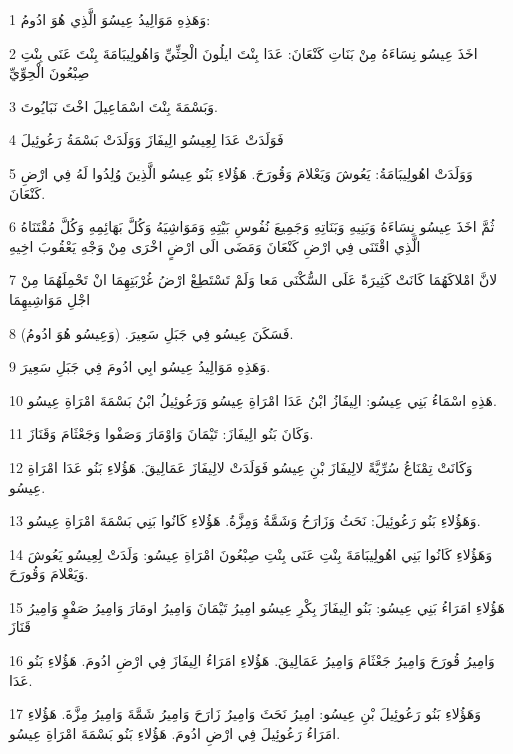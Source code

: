 \par 1 وَهَذِهِ مَوَالِيدُ عِيسُوَ الَّذِي هُوَ ادُومُ:
\par 2 اخَذَ عِيسُو نِسَاءَهُ مِنْ بَنَاتِ كَنْعَانَ: عَدَا بِنْتَ ايلُونَ الْحِثِّيِّ وَاهُولِيبَامَةَ بِنْتَ عَنَى بِنْتِ صِبْعُونَ الْحِوِّيِّ
\par 3 وَبَسْمَةَ بِنْتَ اسْمَاعِيلَ اخْتَ نَبَايُوتَ.
\par 4 فَوَلَدَتْ عَدَا لِعِيسُو الِيفَازَ وَوَلَدَتْ بَسْمَةُ رَعُوئِيلَ
\par 5 وَوَلَدَتْ اهُولِيبَامَةُ: يَعُوشَ وَيَعْلامَ وَقُورَحَ. هَؤُلاءِ بَنُو عِيسُو الَّذِينَ وُلِدُوا لَهُ فِي ارْضِ كَنْعَانَ.
\par 6 ثُمَّ اخَذَ عِيسُو نِسَاءَهُ وَبَنِيهِ وَبَنَاتِهِ وَجَمِيعَ نُفُوسِ بَيْتِهِ وَمَوَاشِيَهُ وَكُلَّ بَهَائِمِهِ وَكُلَّ مُقْتَنَاهُ الَّذِي اقْتَنَى فِي ارْضِ كَنْعَانَ وَمَضَى الَى ارْضٍ اخْرَى مِنْ وَجْهِ يَعْقُوبَ اخِيهِ
\par 7 لانَّ امْلاكَهُمَا كَانَتْ كَثِيرَةً عَلَى السُّكْنَى مَعا وَلَمْ تَسْتَطِعْ ارْضُ غُرْبَتِهِمَا انْ تَحْمِلَهُمَا مِنْ اجْلِ مَوَاشِيهِمَا
\par 8 فَسَكَنَ عِيسُو فِي جَبَلِ سَعِيرَ. (وَعِيسُو هُوَ ادُومُ).
\par 9 وَهَذِهِ مَوَالِيدُ عِيسُو ابِي ادُومَ فِي جَبَلِ سَعِيرَ.
\par 10 هَذِهِ اسْمَاءُ بَنِي عِيسُو: الِيفَازُ ابْنُ عَدَا امْرَاةِ عِيسُو وَرَعُوئِيلُ ابْنُ بَسْمَةَ امْرَاةِ عِيسُو.
\par 11 وَكَانَ بَنُو الِيفَازَ: تَيْمَانَ وَاوْمَارَ وَصَفْوا وَجَعْثَامَ وَقَنَازَ.
\par 12 وَكَانَتْ تِمْنَاعُ سُرِّيَّةً لالِيفَازَ بْنِ عِيسُو فَوَلَدَتْ لالِيفَازَ عَمَالِيقَ. هَؤُلاءِ بَنُو عَدَا امْرَاةِ عِيسُو.
\par 13 وَهَؤُلاءِ بَنُو رَعُوئِيلَ: نَحَثُ وَزَارَحُ وَشَمَّةُ وَمِزَّةُ. هَؤُلاءِ كَانُوا بَنِي بَسْمَةَ امْرَاةِ عِيسُو.
\par 14 وَهَؤُلاءِ كَانُوا بَنِي اهُولِيبَامَةَ بِنْتِ عَنَى بِنْتِ صِبْعُونَ امْرَاةِ عِيسُو: وَلَدَتْ لِعِيسُو يَعُوشَ وَيَعْلامَ وَقُورَحَ.
\par 15 هَؤُلاءِ امَرَاءُ بَنِي عِيسُو: بَنُو الِيفَازَ بِكْرِ عِيسُو امِيرُ تَيْمَانَ وَامِيرُ اومَارَ وَامِيرُ صَفْوٍ وَامِيرُ قَنَازَ
\par 16 وَامِيرُ قُورَحَ وَامِيرُ جَعْثَامَ وَامِيرُ عَمَالِيقَ. هَؤُلاءِ امَرَاءُ الِيفَازَ فِي ارْضِ ادُومَ. هَؤُلاءِ بَنُو عَدَا.
\par 17 وَهَؤُلاءِ بَنُو رَعُوئِيلَ بْنِ عِيسُو: امِيرُ نَحَثَ وَامِيرُ زَارَحَ وَامِيرُ شَمَّةَ وَامِيرُ مِزَّةَ. هَؤُلاءِ امَرَاءُ رَعُوئِيلَ فِي ارْضِ ادُومَ. هَؤُلاءِ بَنُو بَسْمَةَ امْرَاةِ عِيسُو.
